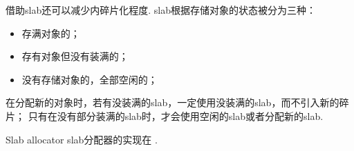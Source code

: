 借助slab还可以减少内碎片化程度.
slab根据存储对象的状态被分为三种：
\begin{itemize}
	\item 存满对象的；
	\item 存有对象但没有装满的；
	\item 没有存储对象的，全部空闲的；
\end{itemize}
在分配新的对象时，若有没装满的slab，一定使用没装满的slab，而不引入新的碎片；
只有在没有部分装满的slab时，才会使用空闲的slab或者分配新的slab.

\begin{readsrcbox}{Slab allocator}
	slab分配器的实现在 .
\end{readsrcbox}

